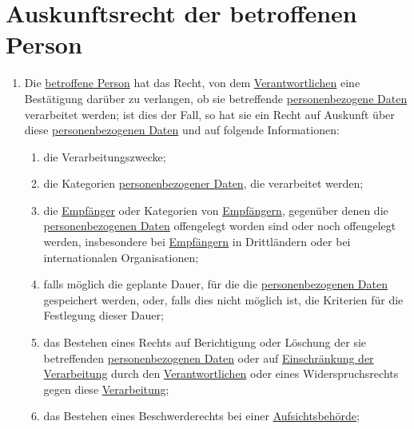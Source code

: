 \chapter{Auskunftsrecht der betroffenen Person}
\label{ch:15}


\begin{enumerate}

  \item Die \hyperref[itm:04-1]{betroffene Person} hat das Recht, von dem \hyperref[itm:04-7]{Verantwortlichen} eine
   Bestätigung darüber zu verlangen, ob sie betreffende \hyperref[itm:04-1]{personenbezogene Daten} verarbeitet werden;
   ist dies der Fall, so hat sie ein Recht auf Auskunft über diese \hyperref[itm:04-1]{personenbezogenen Daten} und auf
   folgende Informationen:
  \label{itm:15-1}

  \begin{enumerate}
  
    \item die Verarbeitungszwecke;
    \label{itm:15-1a}

    \item die Kategorien \hyperref[itm:04-1]{personenbezogener Daten}, die verarbeitet werden;
    \label{itm:15-1b}

    \item die \hyperref[itm:04-9]{Empfänger} oder Kategorien von \hyperref[itm:04-9]{Empfängern}, gegenüber denen
     die \hyperref[itm:04-1]{personenbezogenen Daten} offengelegt worden sind oder noch offengelegt werden,
     insbesondere bei \hyperref[itm:04-9]{Empfängern} in Drittländern oder bei internationalen Organisationen;
    \label{itm:15-1c}

    \item falls möglich die geplante Dauer, für die die \hyperref[itm:04-1]{personenbezogenen Daten} gespeichert werden,
     oder, falls dies nicht möglich ist, die Kriterien für die Festlegung dieser Dauer;
    \label{itm:15-1d}

    \item das Bestehen eines Rechts auf Berichtigung oder Löschung der sie betreffenden \hyperref[itm:04-1]
     {personenbezogenen Daten} oder auf
     \hyperref[itm:04-3]{Einschränkung der Verarbeitung} durch den \hyperref[itm:04-7]{Verantwortlichen} oder eines
      Widerspruchsrechts gegen diese \hyperref[itm:04-2]{Verarbeitung};
    \label{itm:15-1e}

    \item das Bestehen eines Beschwerderechts bei einer \hyperref[itm:04-21]{Aufsichtsbehörde};
    \label{itm:15-1f}


\end{enumerate}
\end{enumerate}
